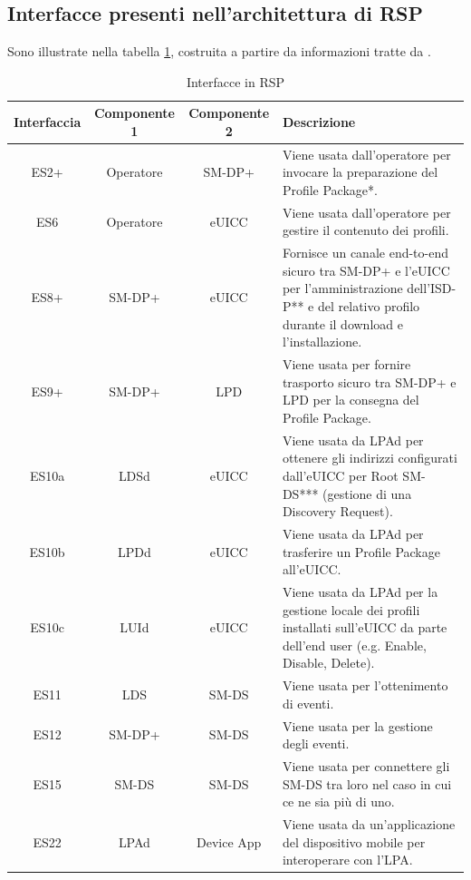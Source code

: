 \documentclass[10pt, oneside]{book}
\begin{document}
\subsection{Interfacce presenti nell'architettura di RSP}
Sono illustrate nella tabella \ref{tab:interfaces}, costruita a partire da informazioni tratte da \cite{GSMA-docs-new}.\\
\begin{table}[h!]
\begin{center}
\captionsetup{skip=4pt}
\caption{Interfacce in RSP}
\label{tab:interfaces}
\begin{tabularx}{\textwidth}{|c|c|c|X|} %
\hline
\textbf{Interfaccia} & \textbf{Componente 1} & \textbf{Componente 2} & \textbf{Descrizione}\\
\hline
ES2+ & Operatore & SM-DP+ & Viene usata dall'operatore per invocare la preparazione del Profile Package*.\\
\hline
ES6 & Operatore & eUICC & Viene usata dall'operatore per gestire il contenuto dei profili.\\
\hline
ES8+ & SM-DP+ & eUICC & Fornisce un canale end-to-end sicuro tra SM-DP+ e l'eUICC per l'amministrazione dell'ISD-P** e del relativo profilo durante il download e l'installazione.\\
\hline
ES9+ & SM-DP+ & LPD & Viene usata per fornire trasporto sicuro tra SM-DP+ e LPD per la consegna del Profile Package.\\
\hline
ES10a & LDSd & eUICC & Viene usata da LPAd per ottenere gli indirizzi configurati dall'eUICC per Root SM-DS*** (gestione di una Discovery Request).\\
\hline
ES10b & LPDd & eUICC & Viene usata da LPAd per trasferire un Profile Package all'eUICC.\\
\hline
ES10c & LUId & eUICC & Viene usata da LPAd per la gestione locale dei profili installati sull'eUICC da parte dell'end user (e.g. Enable, Disable, Delete).\\
\hline
ES11 & LDS & SM-DS & Viene usata per l'ottenimento di eventi.\\
\hline
ES12 & SM-DP+ & SM-DS & Viene usata per la gestione degli eventi.\\
\hline
ES15 & SM-DS & SM-DS & Viene usata per connettere gli SM-DS tra loro nel caso in cui ce ne sia più di uno.\\
\hline
ES22 & LPAd & Device App & Viene usata da un'applicazione del dispositivo mobile per interoperare con l'LPA.\\

\end{tabularx}
\end{center}
\end{table}
\end{document}
